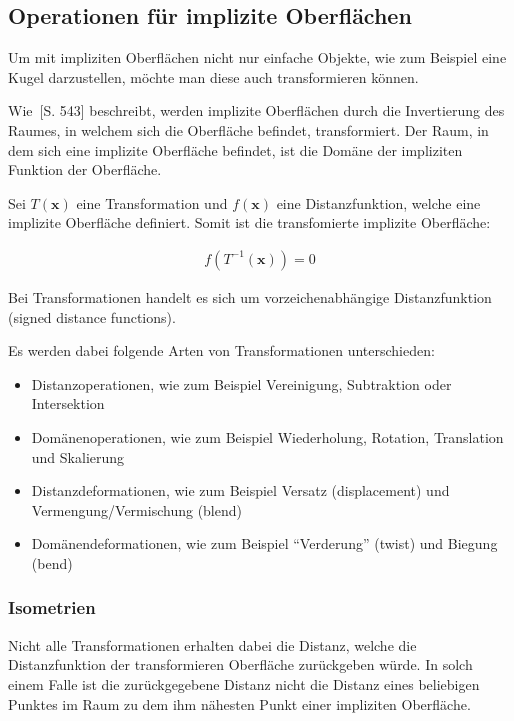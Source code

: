 \subsection{Operationen für implizite Oberflächen}
\label{subsec:implicit_surfaces_ops}

Um mit impliziten Oberflächen nicht nur einfache Objekte, wie zum Beispiel eine
Kugel darzustellen, möchte man diese auch transformieren können.

Wie~\cite{hart_sphere_1994}[S. 543] beschreibt, werden implizite Oberflächen
durch die Invertierung des Raumes, in welchem sich die Oberfläche befindet,
transformiert. Der Raum, in dem sich eine implizite Oberfläche befindet, ist
die Domäne der impliziten Funktion der Oberfläche.

Sei $T(\bm{x})$ eine Transformation und $f(\bm{x})$ eine Distanzfunktion,
welche eine implizite Oberfläche definiert. Somit ist die transfomierte
implizite Oberfläche:

\begin{gather}
    f(T^{-1}(\bm{x})) = 0
\end{gather}

Bei Transformationen handelt es sich um vorzeichenabhängige Distanzfunktion
(signed distance functions).

Es werden dabei folgende Arten von Transformationen unterschieden:
\begin{itemize}
    \item Distanzoperationen, wie zum Beispiel Vereinigung, Subtraktion oder Intersektion
    \item Domänenoperationen, wie zum Beispiel Wiederholung, Rotation, Translation und Skalierung
    \item Distanzdeformationen, wie zum Beispiel Versatz (displacement) und Vermengung/Vermischung (blend)
    \item Domänendeformationen, wie zum Beispiel ``Verderung'' (twist) und Biegung (bend)
\end{itemize}

\subsubsection{Isometrien}
\label{ssubsec:implicit_surfaces_ops_isometries}

Nicht alle Transformationen erhalten dabei die Distanz, welche die
Distanzfunktion der transformieren Oberfläche zurückgeben würde. In solch einem
Falle ist die zurückgegebene Distanz nicht die Distanz eines beliebigen Punktes
im Raum zu dem ihm nähesten Punkt einer impliziten Oberfläche.

